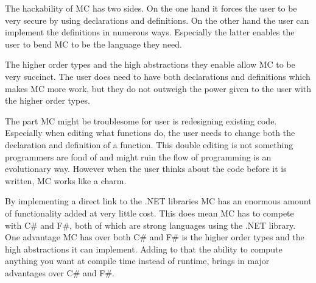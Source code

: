 The hackability of MC has two sides.
On the one hand it forces the user to be very secure by using declarations and definitions.
On the other hand the user can implement the definitions in numerous ways.
Especially the latter enables the user to bend MC to be the language they need.

The higher order types and the high abstractions they enable allow MC to be very succinct.
The user does need to have both declarations and definitions which makes MC more work, but they do not outweigh the power given to the user with the higher order types.

The part MC might be troublesome for user is redesigning existing code.
Especially when editing what functions do, the user needs to change both the declaration and definition of a function.
This double editing is not something programmers are fond of and might ruin the flow of programming is an evolutionary way.
However when the user thinks about the code before it is written, MC works like a charm.

By implementing a direct link to the .NET libraries MC has an enormous amount of functionality added at very little cost.
This does mean MC has to compete with C\# and F\#, both of which are strong languages using the .NET library.
One advantage MC has over both C\# and F\# is the higher order types and the high abstractions it can implement.
Adding to that the ability to compute anything you want at compile time instead of runtime, brings in major advantages over C\# and F\#.


